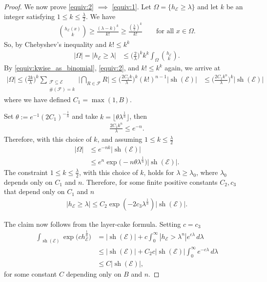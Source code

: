 \documentclass[oneside]{amsart}
\theoremstyle{definition}
\theoremstyle{plain}
\numberwithin{equation}{section}
\numberwithin{theorem}{section}
\newcommand{\sh}{\operatorname{sh}}
\begin{document}
\begin{proof}
  We now prove \ref{equiv:2} $\implies$ \ref{equiv:1}.
  Let $\Omega = \{h_{\mathcal{E}} \geq \lambda\}$ and let $k$ be an integer
  satisfying $1 \leq k \leq \frac{\lambda}{2}$.
  We have
  \begin{align*}
    \binom{h_{\mathcal{E}}(x)}{k} \geq \frac{(\lambda - k)^k}{k!}
    \geq \frac{(\frac{\lambda}{2})^k}{k!} \qquad \text{for all $x \in \Omega$.}
  \end{align*}
  So, by Chebyshev's inequality and $k! \leq k^k$
  \begin{align*}
    |\Omega| = |h_{\mathcal{E}} \geq \lambda| &\leq
    \bigg(\frac{2}{\lambda}\bigg)^k k^k \int_{\Omega}
    \binom{h_{\mathcal{E}}}{k}.
  \end{align*}
  By \eqref{equiv:kwise_as_binomial}, \ref{equiv:2}, and $k! \leq k^k$ again, we
  arrive at
  \begin{align*}
    |\Omega| \leq \bigg(\frac{2k}{\lambda} \bigg)^k
    \sum_{\substack{\mathcal{F} \subseteq \mathcal{E} \\
      \#(\mathcal{F}) = k
    }} \Big| \bigcap_{R \in \mathcal{F}} R \Big|
    \leq \bigg(\frac{2 C_1 k}{\lambda} \bigg)^k (k!)^{n-1} |\sh(\mathcal{E})|
    &\leq \bigg(\frac{2 C_1 k^n}{\lambda} \bigg)^k |\sh(\mathcal{E})|
  \end{align*}
  where we have defined $C_1 = \max(1,B)$.

  Set $\theta := e^{-1}(2C_1)^{-\frac{1}{n}}$ and take
  $k = \lfloor \theta \lambda^{\frac{1}{n}} \rfloor$, then
  \begin{align*}
    \frac{2 C_1 k^n}{\lambda} \leq e^{-n}.
  \end{align*}
  Therefore, with this choice of $k$, and assuming $1 \leq k \leq
  \frac{\lambda}{2}$
  \begin{align*}
    |\Omega| &\leq e^{-nk} |\sh(\mathcal{E})| \\
    &\leq e^{n} \exp\Big(
      -n\theta \lambda^{\frac{1}{n}}\Big) |\sh(\mathcal{E})|.
  \end{align*}
  The constraint $1 \leq k \leq \frac{\lambda}{2}$, with this choice of $k$,
  holds for $\lambda \geq \lambda_0$, where $\lambda_0$ depends only on $C_1$
  and $n$.
  Therefore, for some finite positive constants $C_2, c_3$ that depend only on
  $C_1$ and $n$
  \begin{align*}
    |h_{\mathcal{E}} \geq \lambda| \leq C_2 \exp(-2c_3
    \lambda^{\frac{1}{n}})|\sh(\mathcal{E})|.
  \end{align*}

  The claim now follows from the layer-cake formula. Setting $c = c_3$
  \begin{align*}
    \int_{\sh(\mathcal{E})} \exp\Big(c h_{\mathcal{E}}^{\frac{1}{n}} \Big)
    &= |\sh(\mathcal{E})| + c \int_0^\infty
      |h_{\mathcal{E}} > \lambda^n| e^{c \lambda} \, d\lambda \\
    &\leq |\sh(\mathcal{E})| + C_2 c|\sh(\mathcal{E})|
      \int_0^\infty e^{-c\lambda} \, d\lambda \\
    &\leq C|\sh(\mathcal{E})|,
  \end{align*}
  for some constant $C$ depending only on $B$ and $n$.
\end{proof}
\end{document}
